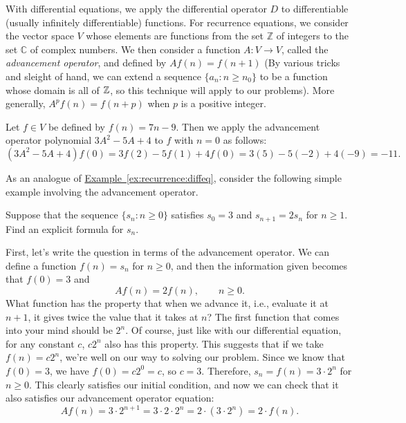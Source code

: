 With differential equations, we apply the differential operator $D$ to
differentiable (usually infinitely differentiable) functions. For
recurrence equations, we consider the vector space $V$ whose elements
are functions from the set $\mathbb{Z}$ of integers to the set
$\mathbb{C}$ of complex numbers.  We then consider a function
$A:V\longrightarrow V$, called the 
\textit{advancement operator}, and defined by $A f(n) = f(n+1)$
(By various tricks and sleight of hand, we can extend a sequence 
$\{a_n\colon n\geq n_0\}$ to be a function whose domain is all of $\mathbb{Z}$, 
so this technique will apply to our problems). 
More generally, $A^p f(n)= f(n+p)$ when $p$ is
a positive integer.

\begin{example}
Let $f\in V$ be defined by $f(n)=7n-9$.  Then we apply the advancement
operator polynomial $3A^2-5A+4$ to $f$ with $n=0$ as follows:
\[
(3A^2-5A+4)f(0)=3f(2) - 5f(1) +4f(0)= 3(5)-5(-2)+4(-9)=-11.
\]
\end{example}

As an analogue of
\hyperref[ex:recurrence:diffeq]{Example~\ref*{ex:recurrence:diffeq}},
consider the following simple example involving the advancement
operator.

\begin{example}\label{ex:recurrence:adveq}
  Suppose that the sequence $\{s_n\colon n\geq 0\}$ satisfies $s_0 =
  3$ and $s_{n+1} = 2s_{n}$ for $n\geq 1$. Find an explicit formula
  for $s_n$.

  First, let's write the question in terms of the advancement
  operator. We can define a function $f(n) = s_n$ for $n\geq 0$, and
  then the information given becomes that $f(0)=3$ and
  \[Af(n) = 2f(n),\qquad n\geq 0.\]
  What function has the property that when we advance it, i.e.,
  evaluate it at $n+1$, it gives twice the value that it takes at $n$?
  The first function that comes into your mind should be $2^n$. Of
  course, just like with our differential equation, for any constant
  $c$, $c2^n$ also has this property. This suggests that if we take
  $f(n) = c2^n$, we're well on our way to solving our problem. Since
  we know that $f(0) = 3$, we have $f(0) = c2^0 = c$, so $c=
  3$. Therefore, $s_n = f(n) = 3\cdot 2^n$ for $n\geq 0$. This clearly
  satisfies our initial condition, and now we can check that it also
  satisfies our advancement operator equation:
  \[Af(n) = 3\cdot 2^{n+1} = 3\cdot 2\cdot 2^n = 2\cdot (3\cdot 2^n) =
  2\cdot f(n).\]
\end{example}

